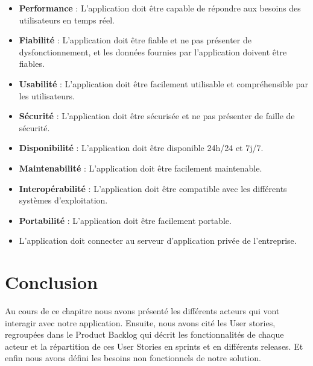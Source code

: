 \begin{itemize}
\item \textbf{Performance} : L'application doit être capable de répondre aux besoins des utilisateurs en temps réel.
\item \textbf{Fiabilité} : L'application doit être fiable et ne pas présenter de dysfonctionnement, et les données fournies par l'application doivent être fiables.
\item \textbf{Usabilité} : L'application doit être facilement utilisable et compréhensible par les utilisateurs.
\item \textbf{Sécurité} : L'application doit être sécurisée et ne pas présenter de faille de sécurité.
\item \textbf{Disponibilité} : L'application doit être disponible 24h/24 et 7j/7.
\item \textbf{Maintenabilité} : L'application doit être facilement maintenable.
\item \textbf{Interopérabilité} : L'application doit être compatible avec les différents systèmes d'exploitation.
\item \textbf{Portabilité} : L'application doit être facilement portable.
\item L'application doit connecter au serveur d'application privée de l'entreprise.
\end{itemize}

\section*{Conclusion}
Au cours de ce chapitre nous avons présenté les différents acteurs qui vont interagir avec notre application. Ensuite, nous avons cité les User stories, regroupées dans le Product Backlog qui décrit les fonctionnalités de chaque acteur et la répartition de ces User Stories en sprints et en différents releases. Et enfin nous avons défini les besoins non fonctionnels de notre solution.